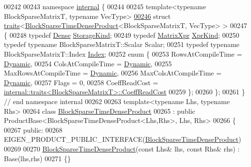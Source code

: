 \begin{DoxyCode}
00242 
00243 \textcolor{keyword}{namespace }\hyperlink{namespaceinternal}{internal} \{
00244 
00245 \textcolor{keyword}{template}<\textcolor{keyword}{typename} BlockSparseMatrixT, \textcolor{keyword}{typename} VecType>
\hyperlink{struct_eigen_1_1internal_1_1traits_3_01_block_sparse_time_dense_product_3_01_block_sparse_matrix_t_00_01_vec_type_01_4_01_4}{00246} \textcolor{keyword}{struct }\hyperlink{struct_eigen_1_1internal_1_1traits}{traits}<\hyperlink{class_eigen_1_1_block_sparse_time_dense_product}{BlockSparseTimeDenseProduct}<BlockSparseMatrixT, VecType> >
00247 \{
00248   \textcolor{keyword}{typedef} \hyperlink{struct_eigen_1_1_dense}{Dense} \hyperlink{struct_eigen_1_1_dense}{StorageKind};
00249   \textcolor{keyword}{typedef} \hyperlink{struct_eigen_1_1_matrix_xpr}{MatrixXpr} \hyperlink{struct_eigen_1_1_matrix_xpr}{XprKind};
00250   \textcolor{keyword}{typedef} \textcolor{keyword}{typename} BlockSparseMatrixT::Scalar Scalar;
00251   \textcolor{keyword}{typedef} \textcolor{keyword}{typename} BlockSparseMatrixT::Index \hyperlink{namespace_eigen_a62e77e0933482dafde8fe197d9a2cfde}{Index};
00252   \textcolor{keyword}{enum} \{
00253     RowsAtCompileTime = \hyperlink{namespace_eigen_ad81fa7195215a0ce30017dfac309f0b2}{Dynamic},
00254     ColsAtCompileTime = \hyperlink{namespace_eigen_ad81fa7195215a0ce30017dfac309f0b2}{Dynamic},
00255     MaxRowsAtCompileTime = \hyperlink{namespace_eigen_ad81fa7195215a0ce30017dfac309f0b2}{Dynamic},
00256     MaxColsAtCompileTime = \hyperlink{namespace_eigen_ad81fa7195215a0ce30017dfac309f0b2}{Dynamic},
00257     Flags = 0,
00258     CoeffReadCost = \hyperlink{struct_eigen_1_1internal_1_1traits}{internal::traits<BlockSparseMatrixT>::CoeffReadCost}
00259   \};
00260 \};
00261 \} \textcolor{comment}{// end namespace internal}
00262 
00263 \textcolor{keyword}{template}<\textcolor{keyword}{typename} Lhs, \textcolor{keyword}{typename} Rhs>
00264 \textcolor{keyword}{class }\hyperlink{class_eigen_1_1_block_sparse_time_dense_product}{BlockSparseTimeDenseProduct}
00265   : \textcolor{keyword}{public} ProductBase<BlockSparseTimeDenseProduct<Lhs,Rhs>, Lhs, Rhs>
00266 \{
00267   \textcolor{keyword}{public}:
00268     EIGEN\_PRODUCT\_PUBLIC\_INTERFACE(\hyperlink{class_eigen_1_1_block_sparse_time_dense_product}{BlockSparseTimeDenseProduct})
00269 
00270     \hyperlink{class_eigen_1_1_block_sparse_time_dense_product}{BlockSparseTimeDenseProduct}(\textcolor{keyword}{const} Lhs& lhs, \textcolor{keyword}{const} Rhs& rhs) : Base(lhs,rhs)
00271     \{\}

\end{DoxyCode}
